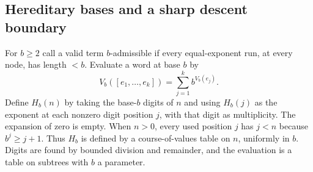 \subsection{Hereditary bases and a sharp descent boundary}
For $b\ge2$ call a valid term $b$-admissible if every equal-exponent run, at every node, has length $<b$. Evaluate a word at base $b$ by
\[
 V_b([e_1,\ldots,e_k])=\sum_{j=1}^k b^{V_b(e_j)}.
\]
Define $H_b(n)$ by taking the base-$b$ digits of $n$ and using $H_b(j)$ as the exponent at each nonzero digit position $j$, with that digit as multiplicity. The expansion of zero is empty. When $n>0$, every used position $j$ has $j<n$ because $b^j\ge j+1$. Thus $H_b$ is defined by a course-of-values table on $n$, uniformly in $b$. Digits are found by bounded division and remainder, and the evaluation is a table on subtrees with $b$ a parameter.

